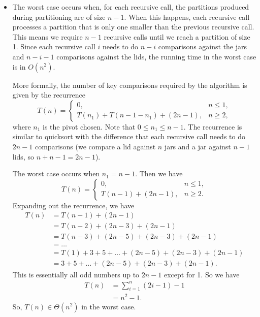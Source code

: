 \documentclass[11pt, letterpaper, titlepage]{article}
\begin{document}
\begin{itemize}
    \item The worst case occurs when, for each recursive call, the partitions produced during partitioning are of size $n - 1$. When this happens, each recursive call processes a partition that is only one smaller than the previous recursive call. This means we require $n - 1$ recursive calls until we reach a partition of size 1. Since each recursive call $i$ needs to do $n - i$ comparisons against the jars and $n - i - 1$ comparisons against the lids, the running time in the worst case is in $O(n^2)$. 
    
    More formally, the number of key comparisons required by the algorithm is given by the recurrence 
    \begin{equation}
        T(n) = \begin{cases}
            0, & n \leq 1, \\
            T(n_1) + T(n - 1 - n_1) + (2n - 1), & n \geq 2,
        \end{cases}
    \end{equation}
    where $n_1$ is the pivot chosen. Note that $0 \leq n_1 \leq n - 1$. The recurrence is similar to quicksort with the difference that each recursive call needs to do $2n - 1$ comparisons (we compare a lid against $n$ jars and a jar against $n - 1$ lids, so $n + n - 1 = 2n - 1$). 
    
    The worst case occurs when $n_1 = n - 1$. Then we have 
    \begin{equation}
        T(n) = \begin{cases}
            0, & n \leq 1, \\
            T(n - 1) + (2n - 1), & n \geq 2.
        \end{cases}
    \end{equation}
    Expanding out the recurrence, we have 
    \begin{align}
        T(n) &= T(n - 1) + (2n - 1) \\
        &= T(n - 2) + (2n - 3) + (2n - 1) \\
        &= T(n - 3) + (2n - 5) + (2n - 3) + (2n - 1) \\
        &= \ldots \\
        &= T(1) + 3 + 5 + \ldots + (2n - 5) + (2n - 3) + (2n - 1) \\
        &= 3 + 5 + \ldots + (2n - 5) + (2n - 3) + (2n - 1).
    \end{align}
    This is essentially all odd numbers up to $2n - 1$ except for 1. So we have
    \begin{align}
        T(n) &= \sum_{i = 1}^n (2i - 1) - 1 \\
        &= n^2 - 1.
    \end{align}
    So, $T(n) \in \Theta(n^2)$ in the worst case.


\end{itemize}
\end{document}
